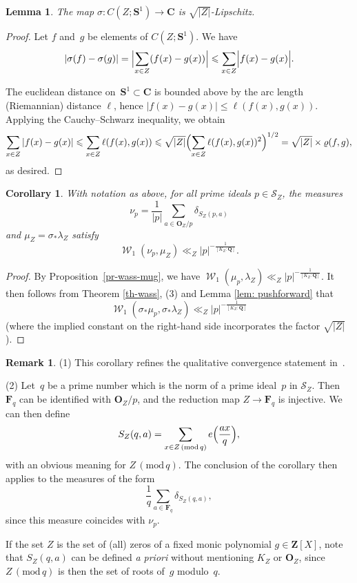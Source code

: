 \documentclass[12pt]{amsart}
\renewcommand{\mathcal}{\mathscr}
\renewcommand{\leq}{\leqslant}
\newcommand{\Cc}{\mathbf{C}}
\newcommand{\Oo}{\mathbf{O}}
\newcommand{\Zz}{\mathbf{Z}}
\newcommand{\Ss}{\mathbf{S}}
\newcommand{\Qq}{\mathbf{Q}}
\newcommand{\Ff}{\mathbf{F}}
\newcommand{\mods}[1]{\,(\mathrm{mod}\,{#1})}
\DeclareMathOperator{\wass}{\mathcal{W}}
\renewcommand{\rho}{\varrho}
\theoremstyle{plain}
\newtheorem{lemma}[theorem]{Lemma}
\newtheorem{corollary}[theorem]{Corollary}
\theoremstyle{remark}
\theoremstyle{definition}
\newtheorem{remark}[theorem]{Remark}
\newcommand{\mcS}{\mathcal{S}}
\renewcommand{\leq}{\leqslant}
\begin{document}
\begin{lemma}\label{lem: pushforward}
  The map $\sigma\colon C(Z;\Ss^1)\to\Cc$ is $\sqrt{|Z|}$-Lipschitz.
\end{lemma}

\begin{proof}
  Let $f$ and~$g$ be elements of $C(Z; \Ss^1)$. We have
  \begin{align*}
    |\sigma(f) -\sigma (g)| = \Bigl|\sum_{x \in Z} (f(x)-
    g(x))\Bigr| \leqslant \sum_{x \in Z}\Bigl|f(x)- g(x)\Bigr|.
  \end{align*}

  The euclidean distance on~$\Ss^1\subset\Cc$ is bounded above by the
  arc length (Riemannian) distance $\ell$, hence
  $|f(x) - g(x)| \leq \ell(f(x), g(x))$. Applying the Cauchy--Schwarz
  inequality, we obtain
  $$
  \sum_{x \in Z} | f(x)- g(x)| \leq \sum_{x \in Z}\ell(
  f(x), g(x)) \leqslant \sqrt{|Z|} \Bigl( \sum_{x \in Z}
  \ell(f(x),g(x))^2\Bigr)^{1/2} = \sqrt{|Z|} \times \rho(f,g),
  $$
  as desired.
\end{proof}

\begin{corollary}\label{cor: quantitative in complex plane}
  With notation as above, for all prime ideals $p\in\mcS_Z$, the
  measures
  \[
    \nu_p = \frac{1}{|p|} \sum_{a \in \Oo_Z /p} \delta_{S_Z(p,a)}
  \]
  and $\mu_Z = \sigma_{*} \lambda_Z$ satisfy
  \[
    \wass_1(\nu_p, \mu_Z) \ll_Z |p|^{-\frac{1}{[K_Z: \Qq]}}.
  \]
\end{corollary}

\begin{proof}
  By Proposition~\ref{pr-wass-mug}, we have
  $\wass_1(\mu_p, \lambda_Z) \ll_Z|p|^{-\frac{1}{[K_Z: \Qq]}}$. It then
  follows from Theorem \ref{th-wass}, (3) and Lemma \ref{lem:
    pushforward} that
  $$
  \wass_1(\sigma_{*}\mu_p, \sigma_{*}\lambda_Z) \ll_Z
  |p|^{-\frac{1}{[K_Z: \Qq]}}
  $$
  (where the implied constant on the right-hand side incorporates the
  factor $\sqrt{|Z|}$).
\end{proof}

\begin{remark}
  (1) This corollary refines the qualitative convergence statement
  in~\cite[Cor. 2.4]{ultrashort}.

  (2) Let~$q$ be a prime number which is the norm of a prime ideal~$p$
  in $\mcS_Z$. Then $\Ff_q$ can be identified with $\Oo_Z/p$, and the
  reduction map $Z\to \Ff_q$ is injective. We can then define
  \[
    S_Z(q,a) = \sum_{x\in Z\mods{q}} e\Bigl(\frac{ax}{q}\Bigr),
  \]
  with an obvious meaning for $Z\mods{q}$.  The conclusion of the
  corollary then applies to the measures of the form
  \[
    \frac{1}{q} \sum_{a \in \Ff_{q}} \delta_{S_Z(q,a)},
  \]
  since this measure coincides with $\nu_p$.

  If the set $Z$ is the set of (all) zeros of a fixed monic polynomial
  $g\in\Zz[X]$, note that $S_Z(q,a)$ can be defined \emph{a priori}
  without mentioning $K_Z$ or $\Oo_Z$, since $Z\mods{q}$ is then the set
  of roots of~$g$ modulo~$q$.
\end{remark}
\end{document}
